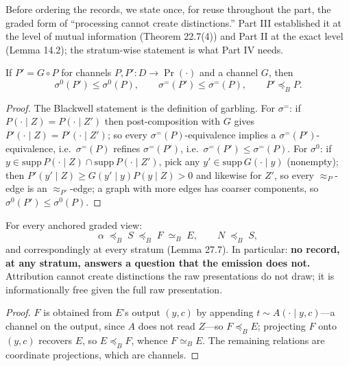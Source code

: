 Before ordering the records, we state once, for reuse throughout the part, the graded form of ``processing cannot create distinctions.'' Part III established it at the level of mutual information (Theorem 22.7(4)) and Part II at the exact level (Lemma 14.2); the stratum-wise statement is what Part IV needs.

\begin{thmplain}

If \(P' = G \circ P\) for channels \(P, P' : D \to \Pr(\cdot)\) and a channel \(G\), then
\[
\sigma^{0}(P') \le \sigma^{0}(P), \qquad \sigma^{=}(P') \le \sigma^{=}(P), \qquad P' \preceq_B P .
\]
\end{thmplain}

\begin{proof}

The Blackwell statement is the definition of garbling. For \(\sigma^=\): if \(P(\cdot \mid Z) = P(\cdot \mid Z')\) then post-composition with \(G\) gives \(P'(\cdot \mid Z) = P'(\cdot \mid Z')\); so every \(\sigma^=(P)\)-equivalence implies a \(\sigma^=(P')\)-equivalence, i.e.~\(\sigma^=(P)\) refines \(\sigma^=(P')\), i.e.~\(\sigma^=(P') \le \sigma^=(P)\). For \(\sigma^0\): if \(y \in \mathrm{supp}\,P(\cdot \mid Z) \cap \mathrm{supp}\,P(\cdot \mid Z')\), pick any \(y' \in \mathrm{supp}\,G(\cdot \mid y)\) (nonempty); then \(P'(y' \mid Z) \ge G(y' \mid y) P(y \mid Z) > 0\) and likewise for \(Z'\), so every \(\approx_P\)-edge is an \(\approx_{P'}\)-edge; a graph with more edges has coarser components, so \(\sigma^0(P') \le \sigma^0(P)\).
\end{proof}

\begin{thmplain}

For every anchored graded view:
\[
\alpha \;\preceq_B\; S \;\preceq_B\; F \;\simeq_B\; E,
\qquad
N \;\preceq_B\; S,
\]
and correspondingly at every stratum (Lemma 27.7). In particular: \textbf{no record, at any stratum, answers a question that the emission does not.} Attribution cannot create distinctions the raw presentations do not draw; it is informationally free given the full raw presentation.
\end{thmplain}

\begin{proof}

\(F\) is obtained from \(E\)'s output \((y,c)\) by appending \(t \sim A(\cdot \mid y, c)\)---\hspace{0pt}a channel on the output, since \(A\) does not read \(Z\)---\hspace{0pt}so \(F \preceq_B E\); projecting \(F\) onto \((y,c)\) recovers \(E\), so \(E \preceq_B F\), whence \(F \simeq_B E\). The remaining relations are coordinate projections, which are channels.
\end{proof}

